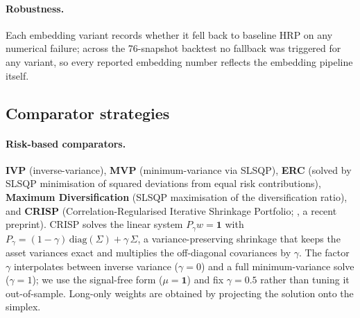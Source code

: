 \documentclass[11pt,a4paper]{article}
\begin{document}
\paragraph{Robustness.} Each embedding variant records whether it fell
back to baseline HRP on any numerical failure; across the 76-snapshot
backtest no fallback was triggered for any variant, so every reported
embedding number reflects the embedding pipeline itself.

\subsection{Comparator strategies}
\label{sec:methods-comparators}

\paragraph{Risk-based comparators.}
\textbf{IVP} (inverse-variance), \textbf{MVP} (minimum-variance via SLSQP),
\textbf{ERC} \citep{maillard2010erc} (solved by SLSQP minimisation of
squared deviations from equal risk contributions), \textbf{Maximum
Diversification} \citep{choueifaty2008maxdiv} (SLSQP maximisation of
the diversification ratio), and \textbf{CRISP} (Correlation-Regularised
Iterative Shrinkage Portfolio; \citealp{wuebben2026crisp}, a recent
preprint). CRISP solves
the linear system $P_\gamma w = \mathbf{1}$ with
$P_\gamma = (1-\gamma)\,\mathrm{diag}(\Sigma) + \gamma\,\Sigma$, a
variance-preserving shrinkage that keeps the asset variances exact and
multiplies the off-diagonal covariances by $\gamma$. The factor
$\gamma$ interpolates between inverse variance ($\gamma=0$) and a full
minimum-variance solve ($\gamma=1$); we use the signal-free form
($\mu=\mathbf{1}$) and fix $\gamma=0.5$ rather than tuning it
out-of-sample. Long-only weights are obtained by projecting the
solution onto the simplex.
\end{document}
